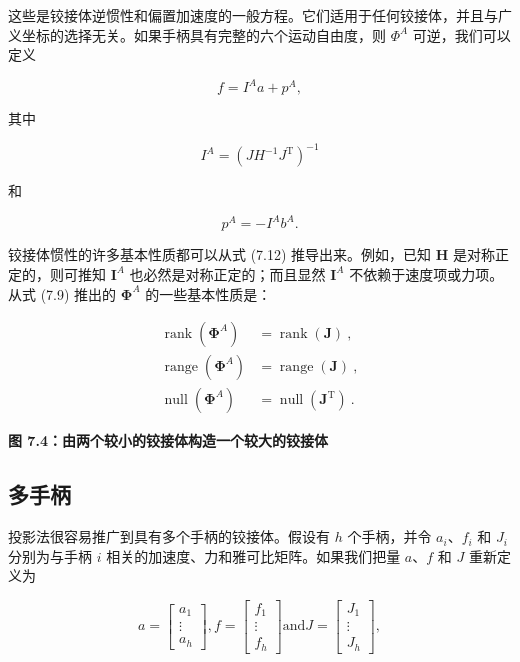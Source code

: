 \documentclass[10pt,a4paper]{book}
\theoremstyle{thmstyle} %
\theoremstyle{defstyle} %
\theoremstyle{prostyle} %
\begin{document}
这些是铰接体逆惯性和偏置加速度的一般方程。它们适用于任何铰接体，并且与广义坐标的选择无关。如果手柄具有完整的六个运动自由度，则 $\Phi^{A}$ 可逆，我们可以定义



$$
f = I ^{A} a + p ^{A} ,
$$



其中



$$
I ^{A} = ( J H ^{- 1} J ^{\mathrm { T} } ) ^{- 1}
$$



和



$$
p ^{A} = - I ^{A} b ^{A} .
$$



铰接体惯性的许多基本性质都可以从式 (7.12) 推导出来。例如，已知 $\boldsymbol{H}$ 是对称正定的，则可推知 $\boldsymbol{I}^{A}$ 也必然是对称正定的；而且显然 $\boldsymbol{I}^{A}$ 不依赖于速度项或力项。从式 (7.9) 推出的 $\boldsymbol{\Phi}^{A}$ 的一些基本性质是：



$$
\begin{aligned}\operatorname{rank}(\boldsymbol{\Phi}^A)&=\operatorname{rank}(\boldsymbol{J})\:,\\\operatorname{range}(\boldsymbol{\Phi}^A)&=\operatorname{range}(\boldsymbol{J})\:,\\\operatorname{null}(\boldsymbol{\Phi}^A)&=\operatorname{null}(\boldsymbol{J}^\mathrm{T})\:.\end{aligned}
$$



\noindent\textbf{图 7.4：由两个较小的铰接体构造一个较大的铰接体}





\subsection{多手柄}





投影法很容易推广到具有多个手柄的铰接体。假设有 $h$ 个手柄，并令 $a_i$、$f_i$ 和 $J_i$ 分别为与手柄 $i$ 相关的加速度、力和雅可比矩阵。如果我们把量 $a$、$f$ 和 $J$ 重新定义为



$$
a = \left[ \begin{array}{l} { a _ { 1 } } \\{ \vdots } \\{ a _ { h } } \end{array} \right] ,  f = \left[ \begin{array}{l} { f _ { 1 } } \\{ \vdots } \\{ f _ { h } } \end{array} \right]  \mathrm { a n d }  J = \left[ \begin{array}{l} { J _ { 1 } } \\{ \vdots } \\{ J _ { h } } \end{array} \right] ,
$$
\end{document}
